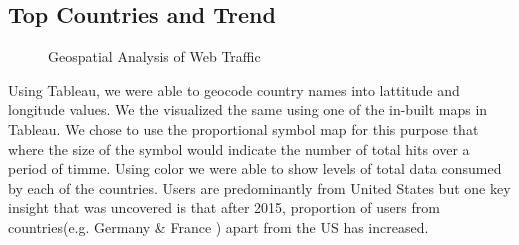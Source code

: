\subsection{Top Countries and Trend} \label{vizcountries}
 

\begin{figure}
\centering
{}
\caption{Geospatial Analysis of Web Traffic}
\label{fig:TopCountries}
\end{figure}

Using Tableau, we were able to geocode country names into lattitude and longitude values. We the visualized the same using one of the in-built maps in Tableau. We chose to use the proportional symbol map for this purpose that where the size of the symbol would indicate the number of total hits over a period of timme. Using color we were able to show levels of total data consumed by each of the countries. Users are predominantly from United States but one key insight that was uncovered is that after 2015, proportion of users from countries(e.g. Germany & France ) apart from the US has increased. 
